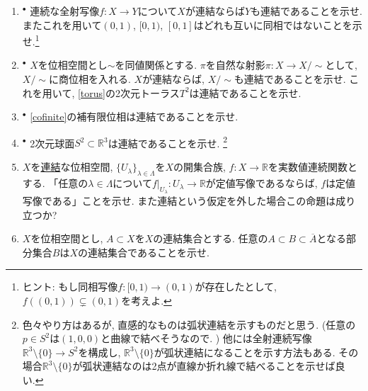 \documentclass[dvipdfmx,a4paper,11pt]{article}
\newcommand{\R}{\mathbb{R}}
\newcommand{\C}{\mathbb{C}}
\theoremstyle{definition}
\begin{document}
\begin{enumerate}[label=\textbf{問}\ref*{sec-connected}.\arabic*]
	\setlength{\parskip}{0cm} 
  \setlength{\itemsep}{7pt} 


\item \label{connected_conti}$^{\bullet}$ 連続な全射写像$f: X \rightarrow Y$について$X$が連結ならば$Y$も連結であることを示せ. またこれを用いて$(0,1)$, $[0,1)$, $[0,1]$はどれも互いに同相ではないことを示せ.\footnote{ヒント: もし同相写像$f : [0,1) \to (0,1)$が存在したとして, $f((0,1)) \subsetneq (0,1)$を考えよ.}


\item $^{\bullet}$ $X$を位相空間とし$\sim$を同値関係とする. $\pi$を自然な射影$\pi : X\to X/\sim $として, $X/\sim$に商位相を入れる. $X$が連結ならば, $X/\sim$も連結であることを示せ. これを用いて, \ref{torus}の2次元トーラス$T^2$は連結であることを示せ. 

\item $^{\bullet}$ \ref{cofinite}の補有限位相は連結であることを示せ.

\item $^\bullet$  2次元球面$S^2 \subset \R^3$は連結であることを示せ. \footnote{色々やり方はあるが, 直感的なものは弧状連結を示すものだと思う. (任意の$p \in S^2$は$(1,0,0)$と曲線で結べそうなので. ) 他には全射連続写像$\R^3 \setminus \{ 0\} \to S^2$を構成し, $\R^3 \setminus \{ 0\} $が弧状連結になることを示す方法もある. その場合$\R^3 \setminus \{ 0\} $が弧状連結なのは2点が直線か折れ線で結べることを示せば良い.}

\item $X$を\underline{連結}な位相空間, $\{ U_{\lambda}\}_{\lambda \in \Lambda}$を$X$の開集合族, $f : X \to \R$を実数値連続関数とする.
「任意の$\lambda \in \Lambda$について$f|_{U_{\lambda}} : U_{\lambda} \to \R$が定値写像であるならば, $f$は定値写像である」ことを示せ. また連結という仮定を外した場合この命題は成り立つか?


\item  $X$を位相空間とし, $A \subset X$を$X$の連結集合とする. 任意の$A \subset B \subset \overline{A}$となる部分集合$B$は$X$の連結集合であることを示せ.


\end{enumerate}
\end{document}
